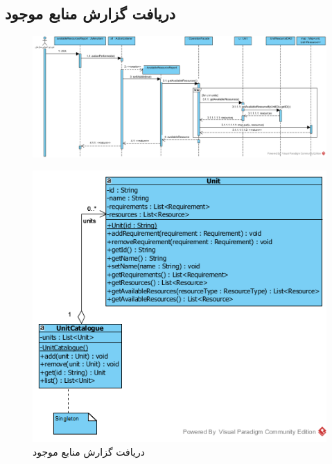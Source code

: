 \begin{landscape}
\section{دریافت گزارش منابع موجود}
\begin{figure}[H]
	\centering
	\includegraphics[scale=0.7]{img/sequence-design/AvailableResourcesReport}
\end{figure}
\begin{figure}[H]
	\centering
	\includegraphics[scale=0.7]{img/sequence-design/AvailableResourcesReportC}
	\caption{دریافت گزارش منابع موجود}
\end{figure}



\end{landscape}
